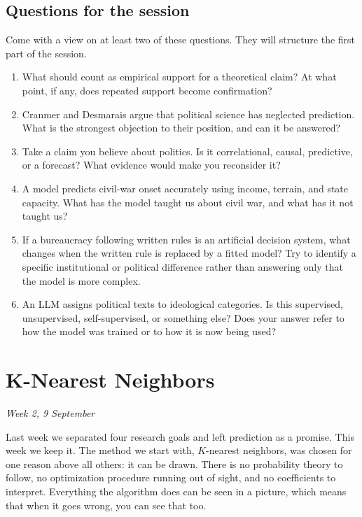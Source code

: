 \documentclass[
  a4paper,
]{scrbook}
\begin{document}
\section{Questions for the session}\label{questions-for-the-session}

Come with a view on at least two of these questions. They will structure
the first part of the session.

\begin{enumerate}
\def\labelenumi{\arabic{enumi}.}
\item
  What should count as empirical support for a theoretical claim? At
  what point, if any, does repeated support become confirmation?
\item
  Cranmer and Desmarais argue that political science has neglected
  prediction. What is the strongest objection to their position, and can
  it be answered?
\item
  Take a claim you believe about politics. Is it correlational, causal,
  predictive, or a forecast? What evidence would make you reconsider it?
\item
  A model predicts civil-war onset accurately using income, terrain, and
  state capacity. What has the model taught us about civil war, and what
  has it not taught us?
\item
  If a bureaucracy following written rules is an artificial decision
  system, what changes when the written rule is replaced by a fitted
  model? Try to identify a specific institutional or political
  difference rather than answering only that the model is more complex.
\item
  An LLM assigns political texts to ideological categories. Is this
  supervised, unsupervised, self-supervised, or something else? Does
  your answer refer to how the model was trained or to how it is now
  being used?
\end{enumerate}

\chapter{K-Nearest Neighbors}\label{k-nearest-neighbors}

\emph{Week 2, 9 September}

Last week we separated four research goals and left prediction as a
promise. This week we keep it. The method we start with, \(K\)-nearest
neighbors, was chosen for one reason above all others: it can be drawn.
There is no probability theory to follow, no optimization procedure
running out of sight, and no coefficients to interpret. Everything the
algorithm does can be seen in a picture, which means that when it goes
wrong, you can see that too.
\end{document}
